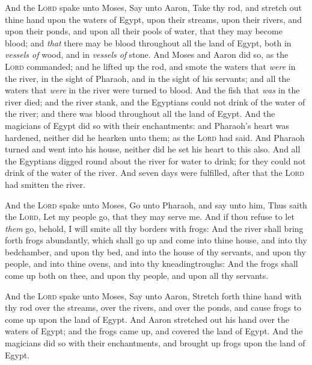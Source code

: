 \documentclass[11pt,letterpaper,oneside]{memoir}
\begin{document}
And the \textsc{Lord} spake unto Moses, Say unto Aaron, Take thy rod,
and stretch out thine hand upon the waters of Egypt, upon their streams,
upon their rivers, and upon their ponds, and upon all their pools of
water, that they may become blood; and \emph{that} there may be blood
throughout all the land of Egypt, both in \emph{vessels of} wood, and in
\emph{vessels of} stone. And Moses and Aaron did so, as the
\textsc{Lord} commanded; and he lifted up the rod, and smote the waters
that \emph{were} in the river, in the sight of Pharaoh, and in the sight
of his servants; and all the waters that \emph{were} in the river were
turned to blood. And the fish that \emph{was} in the river died; and the
river stank, and the Egyptians could not drink of the water of the
river; and there was blood throughout all the land of Egypt. And the
magicians of Egypt did so with their enchantments: and Pharaoh's heart
was hardened, neither did he hearken unto them; as the \textsc{Lord} had
said. And Pharaoh turned and went into his house, neither did he set his
heart to this also. And all the Egyptians digged round about the river
for water to drink; for they could not drink of the water of the river.
And seven days were fulfilled, after that the \textsc{Lord} had smitten
the river.

And the \textsc{Lord} spake unto Moses, Go unto Pharaoh, and say unto
him, Thus saith the \textsc{Lord}, Let my people go, that they may serve
me. And if thou refuse to let \emph{them} go, behold, I will smite all
thy borders with frogs: And the river shall bring forth frogs
abundantly, which shall go up and come into thine house, and into thy
bedchamber, and upon thy bed, and into the house of thy servants, and
upon thy people, and into thine ovens, and into thy kneadingtroughs: And
the frogs shall come up both on thee, and upon thy people, and upon all
thy servants.

And the \textsc{Lord} spake unto Moses, Say unto Aaron, Stretch forth
thine hand with thy rod over the streams, over the rivers, and over the
ponds, and cause frogs to come up upon the land of Egypt. And Aaron
stretched out his hand over the waters of Egypt; and the frogs came up,
and covered the land of Egypt. And the magicians did so with their
enchantments, and brought up frogs upon the land of Egypt.
\end{document}
